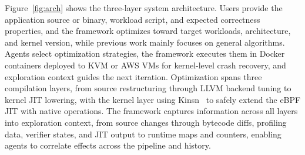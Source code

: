 \documentclass[sigplan,10pt,anonymous,nonacm]{acmart}
\begin{document}
Figure~\ref{fig:arch} shows the three-layer system architecture.
Users provide the application source or binary, workload script, and expected correctness properties, and the framework optimizes toward target workloads, architecture, and kernel version, while previous work mainly focuses on general algorithms.
Agents select optimization strategies, the framework executes them in Docker containers deployed to KVM or AWS VMs for kernel-level crash recovery, and exploration context guides the next iteration.
Optimization spans three compilation layers, from source restructuring through LLVM backend tuning to kernel JIT lowering, with the kernel layer using Kinsn~\cite{kinsn2026} to safely extend the eBPF JIT with native operations.
The framework captures information across all layers into exploration context, from source changes through bytecode diffs, profiling data, verifier states, and JIT output to runtime maps and counters, enabling agents to correlate effects across the pipeline and history.

\end{document}
